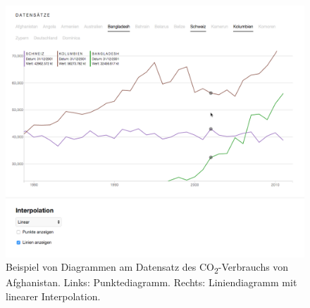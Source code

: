 \begin{figure}[!htbp]
	\centering
	\includegraphics[width=\linewidth]{images/2dline}
	\caption[Vergleich zwischen Punktediagramm und Liniendiagramm]{Beispiel von Diagrammen am Datensatz des CO\textsubscript{2}-Verbrauchs von Afghanistan. Links: Punktediagramm. Rechts: Liniendiagramm mit linearer Interpolation.}
	\label{fig:scatterplot}
\end{figure}